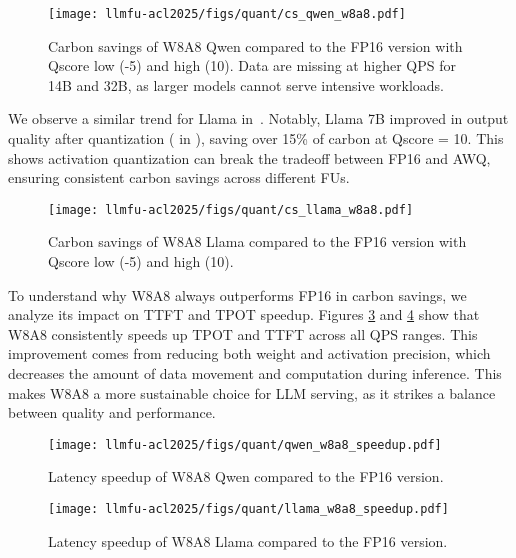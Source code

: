 \begin{figure}[!t]
    \centering
    \texttt{[image: llmfu-acl2025/figs/quant/cs\_qwen\_w8a8.pdf]}
    \vspace{-0.15in}
    \caption{Carbon savings of W8A8 Qwen compared to the FP16 version with Qscore low (-5) and high (10). Data are missing at higher QPS for 14B and 32B, as larger models cannot serve intensive workloads.}
    \label{fig:quant_cs_qwen_w8a8}
\end{figure}

We observe a similar trend for Llama in~. Notably, Llama 7B improved in output quality after quantization ( in ), saving over 15\% of carbon at Qscore = 10. This shows activation quantization can break the tradeoff between FP16 and AWQ, ensuring consistent carbon savings across different FUs.

\begin{figure}[!t]
    \centering
    \texttt{[image: llmfu-acl2025/figs/quant/cs\_llama\_w8a8.pdf]}
    \caption{Carbon savings of W8A8 Llama compared to the FP16 version with Qscore low (-5) and high (10).}
    \vspace{-0.15in}
    \label{fig:quant_cs_llama_w8a8}
\end{figure}

To understand why W8A8 always outperforms FP16 in carbon savings, we analyze its impact on TTFT and TPOT speedup. Figures \ref{fig:quant_speedup_qwen_w8a8} and \ref{fig:quant_speedup_llama_w8a8} show that W8A8 consistently speeds up TPOT and TTFT across all QPS ranges. This improvement comes from reducing both weight and activation precision, which decreases the amount of data movement and computation during inference. This makes W8A8 a more sustainable choice for LLM serving, as it strikes a balance between quality and performance.


\begin{figure}[!t]
    \centering
    \texttt{[image: llmfu-acl2025/figs/quant/qwen\_w8a8\_speedup.pdf]}
    \vspace{-0.15in}
    \caption{Latency speedup of W8A8 Qwen compared to the FP16 version.}
    \label{fig:quant_speedup_qwen_w8a8}
\end{figure}

\begin{figure}[!t]
    \centering
    \texttt{[image: llmfu-acl2025/figs/quant/llama\_w8a8\_speedup.pdf]}
    \vspace{-0.15in}
    \caption{Latency speedup of W8A8 Llama compared to the FP16 version.}
    \label{fig:quant_speedup_llama_w8a8}
\end{figure}



